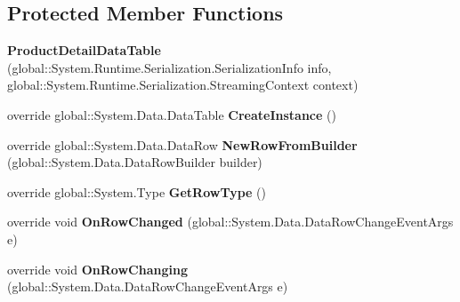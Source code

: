 \subsection*{Protected Member Functions}
\begin{DoxyCompactItemize}
\item 
{\bfseries Product\+Detail\+Data\+Table} (global\+::\+System.\+Runtime.\+Serialization.\+Serialization\+Info info, global\+::\+System.\+Runtime.\+Serialization.\+Streaming\+Context context)\hypertarget{class_products_1_1_data_1_1ds_sage_1_1_product_detail_data_table_aaf1586864c64c58241c614ce90b58a79}{}\label{class_products_1_1_data_1_1ds_sage_1_1_product_detail_data_table_aaf1586864c64c58241c614ce90b58a79}

\item 
override global\+::\+System.\+Data.\+Data\+Table {\bfseries Create\+Instance} ()\hypertarget{class_products_1_1_data_1_1ds_sage_1_1_product_detail_data_table_afb28f92fba34b25f858f486c9a16c5c4}{}\label{class_products_1_1_data_1_1ds_sage_1_1_product_detail_data_table_afb28f92fba34b25f858f486c9a16c5c4}

\item 
override global\+::\+System.\+Data.\+Data\+Row {\bfseries New\+Row\+From\+Builder} (global\+::\+System.\+Data.\+Data\+Row\+Builder builder)\hypertarget{class_products_1_1_data_1_1ds_sage_1_1_product_detail_data_table_ad964f46f694b596c50ac688109925c89}{}\label{class_products_1_1_data_1_1ds_sage_1_1_product_detail_data_table_ad964f46f694b596c50ac688109925c89}

\item 
override global\+::\+System.\+Type {\bfseries Get\+Row\+Type} ()\hypertarget{class_products_1_1_data_1_1ds_sage_1_1_product_detail_data_table_ae0922e5d93d4e8f5192120658731b244}{}\label{class_products_1_1_data_1_1ds_sage_1_1_product_detail_data_table_ae0922e5d93d4e8f5192120658731b244}

\item 
override void {\bfseries On\+Row\+Changed} (global\+::\+System.\+Data.\+Data\+Row\+Change\+Event\+Args e)\hypertarget{class_products_1_1_data_1_1ds_sage_1_1_product_detail_data_table_aef00ef4c7e4efa8e05a939fbe2f66a8c}{}\label{class_products_1_1_data_1_1ds_sage_1_1_product_detail_data_table_aef00ef4c7e4efa8e05a939fbe2f66a8c}

\item 
override void {\bfseries On\+Row\+Changing} (global\+::\+System.\+Data.\+Data\+Row\+Change\+Event\+Args e)\hypertarget{class_products_1_1_data_1_1ds_sage_1_1_product_detail_data_table_aa3e4c4d80679c605914aa80331e6bc52}{}\label{class_products_1_1_data_1_1ds_sage_1_1_product_detail_data_table_aa3e4c4d80679c605914aa80331e6bc52}


\end{DoxyCompactItemize}
